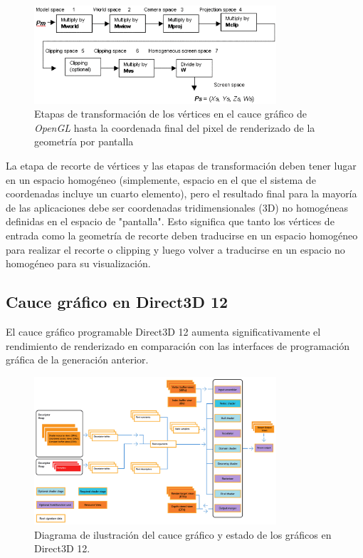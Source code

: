 \documentclass[a4paper]{book}
\begin{document}
\begin{figure}[H]
    \centering
    \includegraphics[width=9cm, keepaspectratio]{img/d3dxfrm61.png}
    \caption{Etapas de transformación de los vértices en el cauce gráfico de \textit{OpenGL} hasta la coordenada final
    del pixel de renderizado de la geometría por pantalla}
    \label{d3dxfrm61}
\end{figure}

La etapa de recorte de vértices y las etapas de transformación deben tener lugar en un espacio homogéneo (simplemente,
espacio en el que el sistema de coordenadas incluye un cuarto elemento), pero el resultado final para la mayoría de
las aplicaciones debe ser coordenadas tridimensionales (3D) no homogéneas definidas en el espacio de "pantalla".
Esto significa que tanto los vértices de entrada como la geometría de recorte deben traducirse en un espacio homogéneo
para realizar el recorte o clipping y luego volver a traducirse en un espacio no homogéneo para su visualización.

\subsection{Cauce gráfico en Direct3D 12}
\label{subsec:CauceDX12}

El cauce gráfico programable Direct3D 12 aumenta significativamente el rendimiento de renderizado en comparación
con las interfaces de programación gráfica de la generación anterior.

\begin{figure}[H]
    \centering
    \includegraphics[width=9cm, keepaspectratio]{img/pipelined123d.png}
    \caption{Diagrama de ilustración del cauce gráfico y estado de los gráficos en Direct3D 12.}
    \label{pipelined123d}
\end{figure}
\end{document}
